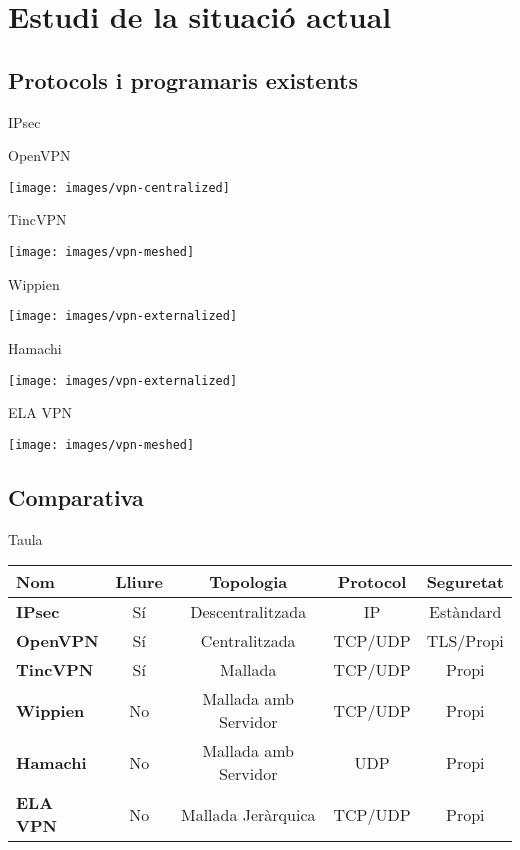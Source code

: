 \section{Estudi de la situació actual}
\subsection{Protocols i programaris existents}
    \begin{frame}{IPsec}
    \end{frame}
    \begin{frame}{OpenVPN}
        \begin{center}
        \texttt{[image: images/vpn-centralized]}
        \end{center}
    \end{frame}
    \begin{frame}{TincVPN}
        \begin{center}
        \texttt{[image: images/vpn-meshed]}
        \end{center}
    \end{frame}
    \begin{frame}{Wippien}
        \begin{center}
        \texttt{[image: images/vpn-externalized]}
        \end{center}
    \end{frame}
    \begin{frame}{Hamachi}
        \begin{center}
        \texttt{[image: images/vpn-externalized]}
        \end{center}
    \end{frame}
    \begin{frame}{ELA VPN}
        \begin{center}
        \texttt{[image: images/vpn-meshed]}
        \end{center}
    \end{frame}

\subsection{Comparativa}
    \begin{frame}{Taula}
        \begin{center}
\begin{tabular}{|l|c|c|c|c|}
\hline
Nom & Lliure & Topologia & Protocol & Seguretat \\ \hline \hline
\bf IPsec & Sí & Descentralitzada & IP & Estàndard \\ \hline
\bf OpenVPN & Sí & Centralitzada & TCP/UDP & TLS/Propi \\ \hline
\bf TincVPN & Sí & Mallada & TCP/UDP & Propi \\ \hline
\bf Wippien & No & Mallada amb Servidor & TCP/UDP & Propi \\ \hline
\bf Hamachi & No & Mallada amb Servidor & UDP & Propi \\ \hline
\bf ELA VPN & No & Mallada Jeràrquica & TCP/UDP & Propi \\ \hline
\end{tabular}
        \end{center}
    \end{frame}
